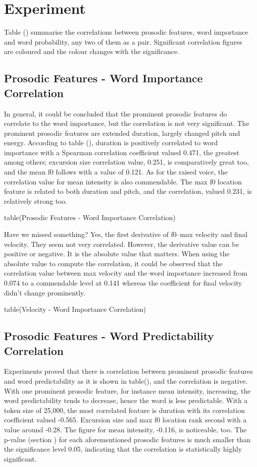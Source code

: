 \chapter{Experiment}

Table () summarise the correlations between prosodic features, word importance and word probability, any two of them as a pair. Significant correlation figures are coloured and the colour changes with the significance. 

\section{Prosodic Features - Word Importance Correlation}

In general, it could be concluded that the prominent prosodic features do correlate to the word importance, but the correlation is not very significant. The prominent prosodic features are extended duration, largely changed pitch and energy. According to table (), duration is positively correlated to word importance with a Spearman correlation coefficient valued 0.471, the greatest among others; excursion size correlation value, 0.251,  is comparatively great too, and the mean f0 follows with a value of 0.121. As for the raised voice, the correlation value for mean intensity is also commendable. The max f0 location feature is related to both duration and pitch, and the correlation, valued 0.231, is relatively strong too.

table(Prosodic Features - Word Importance Correlation)

Have we missed something? Yes, the first derivative of f0--max velocity and final velocity. They seem not very correlated. However, the derivative value can be positive or negative. It is the absolute value that matters. When using the absolute value to compute the correlation, it could be observed that the correlation value between max velocity and the word importance increased from 0.074 to a commendable level at 0.141 whereas the coefficient for final velocity didn't change prominently.

table(Velocity - Word Importance Correlation)

\section{Prosodic Features - Word Predictability Correlation}
Experiments proved that there is correlation between prominent prosodic features and word predictability as it is shown in table(), and the correlation is negative. With one prominent prosodic feature, for instance mean intensity, increasing, the word predictability tends to decrease, hence the word is less predictable. With a token size of 25,000, the most correlated feature is duration with its correlation coefficient valued -0.565. Excursion size and max f0 location rank second with a value around -0.28. The figure for mean intensity, -0.116, is noticeable, too. The p-value (section ) for each aforementioned prosodic features is much smaller than the significance level 0.05, indicating that the correlation is statistically highly significant.


